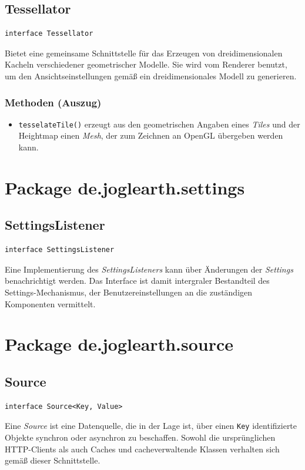 \documentclass[10pt]{scrreprt}
\begin{document}
\subsection*{Tessellator}
\begin{lstlisting}
interface Tessellator
\end{lstlisting}
Bietet eine gemeinsame Schnittstelle für das Erzeugen von dreidimensionalen Kacheln verschiedener geometrischer Modelle. Sie wird vom Renderer benutzt, um den Ansichtseinstellungen gemäß ein dreidimensionales Modell zu generieren.\\
\subsubsection*{Methoden (Auszug)}
\begin{itemize}
\item \texttt{tesselateTile()} erzeugt aus den geometrischen Angaben eines \textit{Tiles} und der Heightmap einen \textit{Mesh}, der zum Zeichnen an OpenGL übergeben werden kann.
\end{itemize}

\vspace{5mm}
\section{Package de.joglearth.settings}
\subsection*{SettingsListener}
\begin{lstlisting}
interface SettingsListener
\end{lstlisting}
Eine Implementierung des \textit{SettingsListeners} kann über Änderungen der \textit{Settings} benachrichtigt werden. Das Interface ist damit intergraler Bestandteil des Settings-Mechanismus, der Benutzereinstellungen an die zuständigen Komponenten vermittelt.\\


\vspace{5mm}
\section{Package de.joglearth.source}
\subsection*{Source}
\begin{lstlisting}
interface Source<Key, Value>
\end{lstlisting}
Eine \textit{Source} ist eine Datenquelle, die in der Lage ist, über einen \texttt{Key} identifizierte Objekte synchron oder asynchron zu beschaffen. Sowohl die ursprünglichen HTTP-Clients als auch Caches und cacheverwaltende Klassen verhalten sich gemäß dieser Schnittstelle.\\
\end{document}

